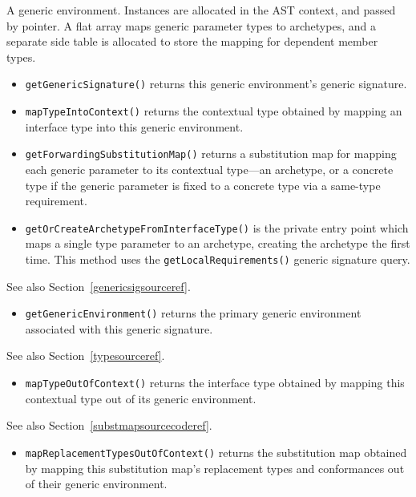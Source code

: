 \documentclass[../generics]{subfiles}
\begin{document}
A generic environment. Instances are allocated in the AST context, and passed by pointer. A flat array maps generic parameter types to archetypes, and a separate side table is allocated to store the mapping for dependent member types.
\begin{itemize}
\item \texttt{getGenericSignature()} returns this generic environment's generic signature.
\item \texttt{mapTypeIntoContext()} returns the contextual type obtained by mapping an interface type into this generic environment.
\item \texttt{getForwardingSubstitutionMap()} returns a substitution map for mapping each generic parameter to its contextual type---an archetype, or a concrete type if the generic parameter is fixed to a concrete type via a same-type requirement.

\item \texttt{getOrCreateArchetypeFromInterfaceType()} is the private entry point which maps a single type parameter to an archetype, creating the archetype the first time. This method uses the \texttt{getLocalRequirements()} generic signature query.
\end{itemize}

See also Section~\ref{genericsigsourceref}.
\begin{itemize}
\item \texttt{getGenericEnvironment()} returns the primary generic environment associated with this generic signature.
\end{itemize}

See also Section~\ref{typesourceref}.
\begin{itemize}
\item \texttt{mapTypeOutOfContext()} returns the interface type obtained by mapping this contextual type out of its generic environment.
\end{itemize}

See also Section~\ref{substmapsourcecoderef}.
\begin{itemize}
\item \texttt{mapReplacementTypesOutOfContext()} returns the substitution map obtained by mapping this substitution map's replacement types and conformances out of their generic environment.
\end{itemize}
\end{document}
